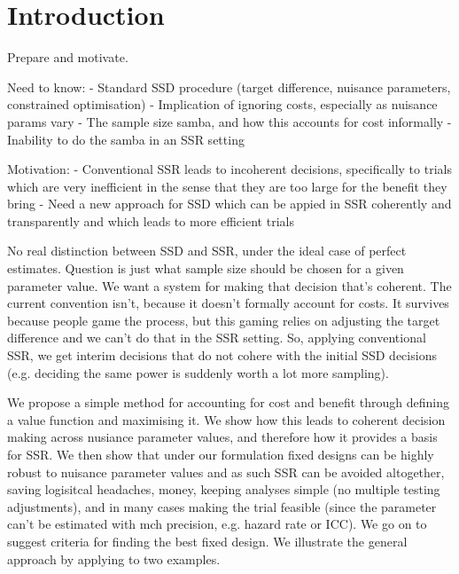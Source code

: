\documentclass[sagev]{sagej}
\begin{document}

\maketitle



\section{Introduction}\label{sec:intro}

Prepare and motivate.

Need to know:
- Standard SSD procedure (target difference, nuisance parameters, constrained optimisation)
- Implication of ignoring costs, especially as nuisance params vary
- The sample size samba, and how this accounts for cost informally
- Inability to do the samba in an SSR setting

Motivation:
- Conventional SSR leads to incoherent decisions, specifically to trials which are very inefficient in the sense that they are too large for the benefit they bring
- Need a new approach for SSD which can be appied in SSR coherently and transparently and which leads to more efficient trials







No real distinction between SSD and SSR, under the ideal case of perfect estimates. Question is just what sample size should be chosen for a given parameter value. We want a system for making that decision that's coherent. The current convention isn't, because it doesn't formally account for costs. It survives because people game the process, but this gaming relies on adjusting the target difference and we can't do that in the SSR setting. So, applying conventional SSR, we get interim decisions that do not cohere with the initial SSD decisions (e.g. deciding the same power is suddenly worth a lot more sampling).

We propose a simple method for accounting for cost and benefit through defining a value function and maximising it. We show how this leads to coherent decision making across nusiance parameter values, and therefore how it provides a basis for SSR. We then show that under our formulation fixed designs can be highly robust to nuisance parameter values and as such SSR can be avoided altogether, saving logisitcal headaches, money, keeping analyses simple (no multiple testing adjustments), and in many cases making the trial feasible (since the parameter can't be estimated with mch precision, e.g. hazard rate or ICC). We go on to suggest criteria for finding the best fixed design. We illustrate the general approach by applying to two examples.
\end{document}
